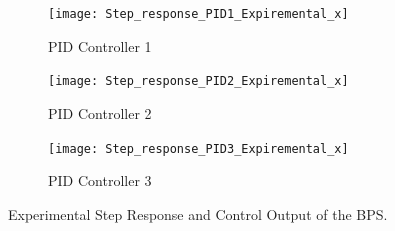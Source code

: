 \begin{figure}[h]
     \centering
     \begin{subfigure}[b]{0.95\textwidth}
         \centering
         \texttt{[image: Step\_response\_PID1\_Expiremental\_x]}
         \caption{PID Controller 1}
         \label{fig:y equals x}
     \end{subfigure}
     \hfill
     \begin{subfigure}[b]{0.95\textwidth}
         \centering
         \texttt{[image: Step\_response\_PID2\_Expiremental\_x]}
         \caption{PID Controller 2}
         \label{fig:three sin x}
     \end{subfigure}
     \hfill
     \begin{subfigure}[b]{0.95\textwidth}
         \centering
         \texttt{[image: Step\_response\_PID3\_Expiremental\_x]}
         \caption{PID Controller 3}
         \label{fig:five over x}
     \end{subfigure}
        \caption{Experimental Step Response and Control Output of the  BPS.}
        \label{fig:three graphs}
\end{figure}


